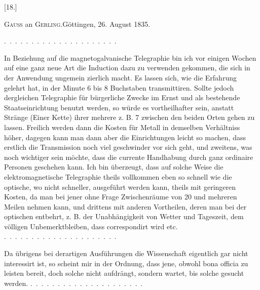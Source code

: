 \clearpage\begingroup{}
\begin{center}[18.]\end{center}
\begin{center}\textsc{Gauss} an \textsc{Gerling}.\quad Göttingen, 26. August 1835.\end{center}
\noindent .\ .\ .\ .\ .\ .\ .\ .\ .\ .\ .\ .\ .\ .\ .\ .\ .\ .\ .\ .\ .\par
\indent In Beziehung auf die magnetogalvanische Telegraphie bin ich vor einigen
Wochen auf eine ganz neue Art die Induction dazu zu verwenden gekommen,
\clearpage{}
\noindent die sich in der Anwendung ungemein zierlich macht. Es lassen sich, wie die
Erfahrung gelehrt hat, in der Minute 6 bis 8 Buchstaben transmittiren. Sollte
jedoch dergleichen Telegraphie für bürgerliche Zwecke im Ernst und als bestehende
Staatseinrichtung benutzt werden, so würde es vortheilhafter sein,
anstatt  Stränge (Einer Kette) ihrer mehrere z. B. 7 zwischen den
beiden Orten gehen zu lassen. Freilich werden dann die Kosten für Metall
in demselben Verhältniss höher, dagegen kann man dann aber die Einrichtungen
leicht so machen, dass erstlich die Transmission noch viel geschwinder vor
sich geht, und zweitens, was noch wichtiger sein möchte, dass die currente
Handhabung durch ganz ordinaire Personen geschehen kann. Ich bin überzeugt,
dass auf solche Weise die elektromagnetische Telegraphie theils vollkommen
eben so schnell wie die optische, wo nicht schneller, ausgeführt
werden kann, theils mit  geringeren Kosten, da man bei jener ohne Frage
Zwischenräume von 20 und mehreren Meilen nehmen kann, und drittens mit
anderen Vortheilen, deren man bei der optischen entbehrt, z. B. der Unabhängigkeit
von Wetter und Tageszeit, dem völligen Unbemerktbleiben, dass
correspondirt wird etc. \mbox{.\ .\ .\ .\ .\ .\ .\ .\ .\ .\ .\ .\ .\ .\ .\ .\ .\ .\ .\ .\ .}

Da übrigens bei derartigen Ausführungen die Wissenschaft eigentlich gar
nicht interessirt ist, so scheint mir in der Ordnung, dass jene, obwohl bona
officia zu leisten bereit, doch solche nicht aufdrängt, sondern wartet, bis solche
gesucht werden. \mbox{.\ .\ .\ .\ .\ .\ .\ .\ .\ .\ .\ .\ .\ .\ .\ .\ .\ .\ .\ .\ .}
\clearpage\endgroup
